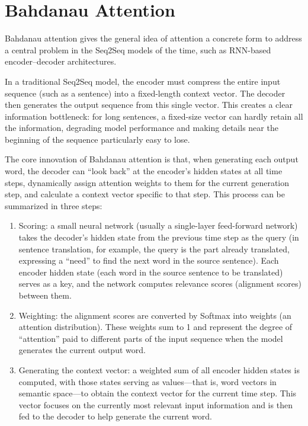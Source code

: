 \setcounter{section}{1}

\hypertarget{bahdanau-attention}{%
\section{Bahdanau Attention}\label{bahdanau-attention}}

Bahdanau attention gives the general idea of attention a concrete form to address a central problem in the Seq2Seq models of the time, such as RNN-based encoder--decoder architectures.

In a traditional Seq2Seq model, the encoder must compress the entire input sequence (such as a sentence) into a fixed-length context vector. The decoder then generates the output sequence from this single vector. This creates a clear information bottleneck: for long sentences, a fixed-size vector can hardly retain all the information, degrading model performance and making details near the beginning of the sequence particularly easy to lose.

The core innovation of Bahdanau attention is that, when generating each output word, the decoder can ``look back'' at the encoder's hidden states at all time steps, dynamically assign attention weights to them for the current generation step, and calculate a context vector specific to that step. This process can be summarized in three steps:

\begin{enumerate}
\def\labelenumi{\arabic{enumi}.}
\item
  Scoring: a small neural network (usually a single-layer feed-forward network) takes the decoder's hidden state from the previous time step as the query (in sentence translation, for example, the query is the part already translated, expressing a ``need'' to find the next word in the source sentence). Each encoder hidden state (each word in the source sentence to be translated) serves as a key, and the network computes relevance scores (alignment scores) between them.
\item
  Weighting: the alignment scores are converted by Softmax into weights (an attention distribution). These weights sum to 1 and represent the degree of ``attention'' paid to different parts of the input sequence when the model generates the current output word.
\item
  Generating the context vector: a weighted sum of all encoder hidden states is computed, with those states serving as values---that is, word vectors in semantic space---to obtain the context vector for the current time step. This vector focuses on the currently most relevant input information and is then fed to the decoder to help generate the current word.
\end{enumerate}

